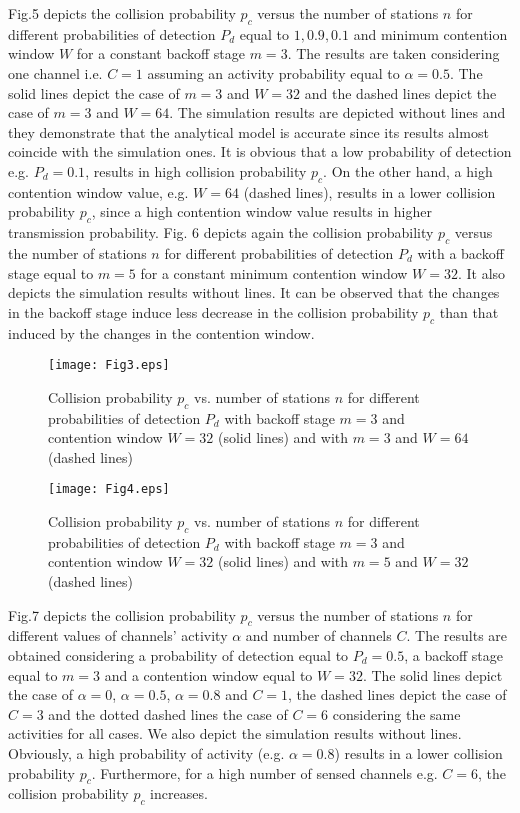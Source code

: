 \documentclass
[journal,11pt,draftclsnofoot,onecolumn,doublespace]{tETN2e}
\begin{document}
Fig.5 depicts the collision probability $p_c$ versus the number of stations $n$ for different probabilities of detection $P_d$ equal to $1,0.9,0.1$ and minimum contention window $W$ for a constant backoff stage $m=3$. The results are  taken considering one channel i.e. $C=1$ assuming an activity probability equal to $\alpha=0.5$. The solid lines depict the case of $m=3$ and $W=32$ and the dashed lines depict the case of $m=3$ and $W=64$. The simulation results are depicted without lines and they demonstrate that the analytical model is accurate since its results almost coincide with the simulation ones. It is obvious that a low probability of detection e.g. $P_d=0.1$, results in high collision probability $p_c$. On the other hand, a high contention window value, e.g. $W=64$ (dashed lines), results in a lower collision probability $p_c$, since a high contention window value results in higher transmission probability. Fig. 6 depicts again the collision probability $p_c$ versus the number of stations $n$ for different probabilities of detection $P_d$ with a backoff stage equal to $m=5$ for a constant minimum contention window $W=32$. It also depicts the simulation results without lines. It can be observed that the changes in the backoff stage induce less decrease in the collision probability $p_c$ than that induced by the changes in the contention window.

\begin{figure}
\centering
  \texttt{[image: Fig3.eps]}\\
  \caption{Collision probability $p_c$ vs. number of stations $n$ for different probabilities of detection $P_d$ with backoff stage $m=3$ and contention window $W=32$ (solid lines) and with $m=3$ and $W=64$ (dashed lines)}
  \label{fig:3}
\end{figure}

\begin{figure}
\centering
  \texttt{[image: Fig4.eps]}\\
  \caption{Collision probability $p_c$ vs. number of stations $n$ for different probabilities of detection $P_d$ with backoff stage $m=3$ and contention window $W=32$ (solid lines) and with $m=5$ and $W=32$ (dashed lines)}
  \label{fig:4}
\end{figure}

Fig.7 depicts the collision probability $p_c$ versus the number of stations $n$ for different values of channels’ activity $\alpha$ and number of channels $C$. The results are obtained considering a probability of detection equal to $P_d=0.5$, a backoff stage equal to $m=3$ and a contention window equal to $W=32$. The solid lines depict the case of $\alpha=0$, $\alpha=0.5$, $\alpha=0.8$ and $C=1$, the dashed lines depict the case of $C=3$ and the dotted dashed lines the case of $C=6$ considering the same activities for all cases. We also depict the simulation results without lines. Obviously, a high probability of activity (e.g. $\alpha=0.8$) results in a lower collision probability $p_c$. Furthermore, for a high number of sensed channels e.g. $C=6$, the collision probability $p_c$ increases.
\end{document}

